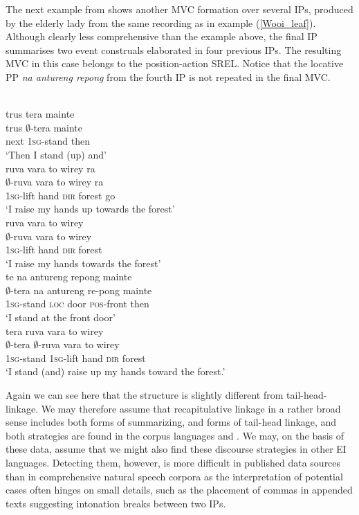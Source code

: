 The next example from  shows another MVC formation over several IPs, produced by the elderly  lady from the same recording as in example (\ref{Wooi_leaf}). Although clearly less comprehensive than the  example above, the final IP summarises two event construals elaborated in four previous IPs. The resulting MVC in this case belongs to the position-action SREL. Notice that the locative PP \textit{na antureng repong} from the fourth IP is not repeated in the final MVC.

\ea 
{}\\
\ea
\glll trus tera mainte \\
trus $\emptyset$-tera mainte \\
next \textsc{1}\textsc{sg}-stand then \\
\glft `Then I stand (up) and'\\ 
\ex
\glll ruva vara to wirey ra \\
$\emptyset$-ruva vara to wirey ra \\
\textsc{1}\textsc{sg}-lift hand \textsc{dir} forest go \\
\glft `I raise my hands up towards the forest'\\ 
\ex
\glll ruva vara to wirey \\
$\emptyset$-ruva vara to wirey \\
\textsc{1}\textsc{sg}-lift hand \textsc{dir} forest \\
\glft `I raise my hands towards the forest'\\ 
\ex
\glll te na antureng repong mainte \\
$\emptyset$-tera na antureng re-pong mainte \\
\textsc{1}\textsc{sg}-stand \textsc{loc} door \textsc{pos}-front then \\
\glft `I stand at the front door'\\ 
\ex
\glll tera ruva vara to wirey \\
$\emptyset$-tera $\emptyset$-ruva vara to wirey \\
\textsc{1}\textsc{sg}-stand \textsc{1}\textsc{sg}-lift hand \textsc{dir} forest \\
\glft `I stand (and) raise up my hands toward the forest.'\\ 
\z
\z

Again we can see here that the structure is slightly different from tail-head-linkage. We may therefore assume that recapitulative linkage in a rather broad sense includes both forms of summarizing, and forms of tail-head linkage, and both strategies are found in the corpus languages  and . We may, on the basis of these data, assume that we might also find these discourse strategies in other EI languages. Detecting them, however, is more difficult in published data sources than in comprehensive natural speech corpora as the interpretation of potential cases often hinges on small details, such as the placement of commas in appended texts suggesting intonation breaks between two IPs.

